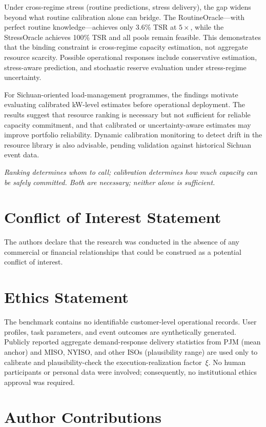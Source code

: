 \documentclass[utf8]{FrontiersinHarvard}
\begin{document}
Under cross-regime stress (routine predictions, stress
delivery), the gap widens beyond what routine calibration
alone can bridge. The RoutineOracle---with perfect routine
knowledge---achieves only 3.6\% TSR at $5\times$, while the
StressOracle achieves 100\% TSR and all pools remain feasible.
This demonstrates that the binding constraint is cross-regime
capacity estimation, not aggregate resource scarcity. Possible
operational responses include conservative estimation,
stress-aware prediction, and stochastic reserve evaluation
under stress-regime uncertainty.

For Sichuan-oriented load-management programmes, the findings
motivate evaluating calibrated kW-level estimates before
operational deployment. The results suggest that resource
ranking is necessary but not sufficient for reliable capacity
commitment, and that calibrated or uncertainty-aware estimates
may improve portfolio reliability. Dynamic calibration monitoring
to detect drift in the resource library is also advisable,
pending validation against historical Sichuan event data.

\textit{Ranking determines whom to call; calibration determines
how much capacity can be safely committed. Both are necessary;
neither alone is sufficient.}


\section*{Conflict of Interest Statement}

The authors declare that the research was conducted in the absence of any commercial or financial relationships that could be construed as a potential conflict of interest.

\section*{Ethics Statement}

The benchmark contains no identifiable customer-level operational
records. User profiles, task parameters, and event outcomes are
synthetically generated. Publicly reported aggregate
demand-response delivery statistics from PJM (mean anchor) and
MISO, NYISO, and other ISOs (plausibility range) are used only
to calibrate and plausibility-check
the execution-realization factor~$\xi$. No human participants
or personal data were involved; consequently, no institutional
ethics approval was required.

\section*{Author Contributions}
\end{document}
